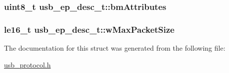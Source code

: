 \label{structusb__ep__desc__t_a1b1f36413d7701c85786390adc914671}
\hypertarget{structusb__ep__desc__t_ae4a54c991f53573380f4500395ed2e1a}{
\subsubsection[{bm\-Attributes}]{\setlength{\rightskip}{0pt plus 5cm}uint8\-\_\-t {\bf usb\-\_\-ep\-\_\-desc\-\_\-t\-::bm\-Attributes}}}
\label{structusb__ep__desc__t_ae4a54c991f53573380f4500395ed2e1a}
\hypertarget{structusb__ep__desc__t_a7224435989a3b19385f6c37f9e606313}{
\subsubsection[{w\-Max\-Packet\-Size}]{\setlength{\rightskip}{0pt plus 5cm}le16\-\_\-t {\bf usb\-\_\-ep\-\_\-desc\-\_\-t\-::w\-Max\-Packet\-Size}}}
\label{structusb__ep__desc__t_a7224435989a3b19385f6c37f9e606313}


\-The documentation for this struct was generated from the following file\-:\begin{DoxyCompactItemize}
\item 
\hyperlink{usb__protocol_8h}{usb\-\_\-protocol.\-h}\end{DoxyCompactItemize}
